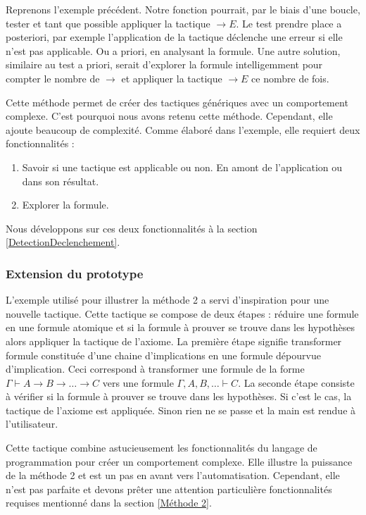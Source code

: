 \documentclass[titlepage,draft]{article}
\begin{document}
Reprenons l'exemple précédent. Notre fonction pourrait, par le biais d'une boucle, tester et tant que possible appliquer la tactique $\to E$. Le test prendre place a posteriori, par exemple l'application de la tactique déclenche une erreur si elle n'est pas applicable. Ou a priori, en analysant la formule. Une autre solution, similaire au test a priori, serait d'explorer la formule intelligemment pour compter le nombre de $\to$ et appliquer la tactique $\to E$ ce nombre de fois.

Cette méthode permet de créer des tactiques génériques avec un comportement complexe. C'est pourquoi nous avons retenu cette méthode. Cependant, elle ajoute beaucoup de complexité. Comme élaboré dans l'exemple, elle requiert deux fonctionnalités :
\begin{enumerate}
    \item Savoir si une tactique est applicable ou non. En amont de l'application ou dans son résultat.
    \item Explorer la formule.
\end{enumerate}
Nous développons sur ces deux fonctionnalités à la section \ref{DetectionDeclenchement}.

\subsubsection{Extension du prototype}
L'exemple utilisé pour illustrer la méthode 2 a servi d'inspiration pour une nouvelle tactique. Cette tactique se compose de deux étapes : réduire une formule en une formule atomique et si la formule à prouver se trouve dans les hypothèses alors appliquer la tactique de l'axiome. La première étape signifie transformer formule constituée d'une chaine d'implications en une formule dépourvue d'implication. Ceci correspond à transformer une formule de la forme $\Gamma \vdash A \to B \to \dots \to C $ vers une formule $\Gamma, A, B, \dots \vdash C$. La seconde étape consiste à vérifier si la formule à prouver se trouve dans les hypothèses. Si c'est le cas, la tactique de l'axiome est appliquée. Sinon rien ne se passe et la main est rendue à l'utilisateur.

Cette tactique combine astucieusement les fonctionnalités du langage de programmation pour créer un comportement complexe. Elle illustre la puissance de la méthode 2 et est un pas en avant vers l'automatisation. Cependant, elle n'est pas parfaite et devons prêter une attention particulière fonctionnalités requises mentionné dans la section \ref{Méthode 2}.
\end{document}
